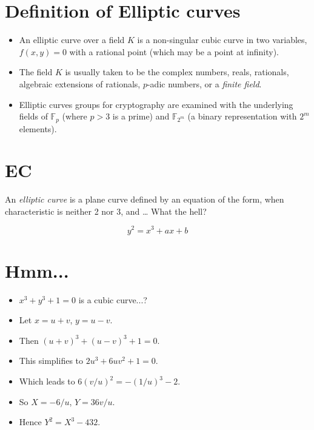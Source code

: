 \newpage
\section*{Definition of Elliptic curves}

\begin{itemize}
	\item An elliptic curve over a field \( K \) is a non-singular cubic curve in two variables, \( f(x,y) = 0 \) with a rational point (which may be a point at infinity).
	
	\item The field \( K \) is usually taken to be the complex numbers, reals, rationals, algebraic extensions of rationals, \( p \)-adic numbers, or a \textit{finite field}.
	
	\item Elliptic curves groups for cryptography are examined with the underlying fields of \( \mathbb{F}_p \) (where \( p > 3 \) is a prime) and \( \mathbb{F}_{2^m} \) (a binary representation with \( 2^m \) elements).
\end{itemize}

\section*{EC}

An \textit{elliptic curve} is a plane curve defined by an equation of the form, when characteristic is neither 2 nor 3, and \ldots{} What the hell?

\[ y^2 = x^3 + ax + b \]

\section*{Hmm...}

\begin{itemize}
	\item \(x^3 + y^3 + 1 = 0\) is a cubic curve...?
	\item Let \(x = u + v\), \(y = u - v\).
	\item Then \( (u+v)^3 + (u-v)^3 + 1 = 0 \).
	\item This simplifies to \( 2u^3 + 6uv^2 + 1 = 0 \).
	\item Which leads to \( 6(v/u)^2 = -(1/u)^3 - 2 \).
	\item So \( X = -6/u\), \( Y = 36v/u \).
	\item Hence \( Y^2 = X^3 - 432 \).
\end{itemize}

